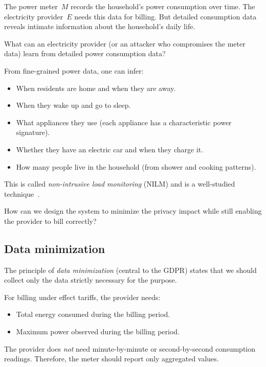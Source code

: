 The power meter~\(M\) records the household's power consumption over time.
The electricity provider~\(E\) needs this data for billing.
But detailed consumption data reveals intimate information about the
household's daily life.

\begin{exercise}
  What can an electricity provider (or an attacker who compromises the
  meter data) learn from detailed power consumption data?
\end{exercise}

From fine-grained power data, one can infer:
\begin{itemize}
  \item When residents are home and when they are away.
  \item When they wake up and go to sleep.
  \item What appliances they use (each appliance has a characteristic power
    signature).
  \item Whether they have an electric car and when they charge it.
  \item How many people live in the household (from shower and cooking
    patterns).
\end{itemize}

This is called \emph{non-intrusive load monitoring} (NILM) and is a
well-studied technique~\autocite{Hart1992nilm}.

\begin{exercise}
  How can we design the system to minimize the privacy impact while still
  enabling the provider to bill correctly?
\end{exercise}

\subsection{Data minimization}

The principle of \emph{data minimization} (central to the \ac{GDPR})
states that we should collect only the data strictly necessary for the
purpose.

For billing under effect tariffs, the provider needs:
\begin{itemize}
  \item Total energy consumed during the billing period.
  \item Maximum power observed during the billing period.
\end{itemize}

The provider does \emph{not} need minute-by-minute or second-by-second
consumption readings.
Therefore, the meter should report only aggregated values.

